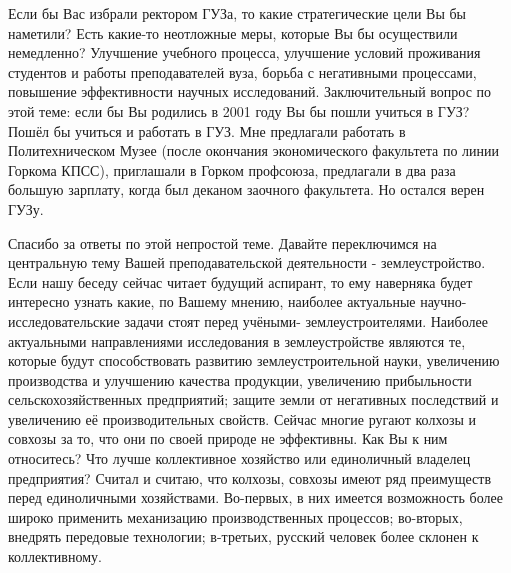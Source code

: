 \begin{drama}
	\maxspeaks Если бы Вас избрали ректором ГУЗа, то какие стратегические цели Вы бы наметили? Есть какие-то неотложные меры, которые Вы бы осуществили немедленно?
	\michaelspeaks Улучшение учебного процесса, улучшение условий проживания студентов и работы преподавателей вуза, борьба с негативными процессами, повышение эффективности научных исследований.
	\maxspeaks Заключительный вопрос по этой теме: если бы Вы родились в 2001 году Вы бы пошли учиться в ГУЗ?
	\michaelspeaks Пошёл бы учиться и работать в ГУЗ. Мне предлагали работать в Политехническом Музее (после окончания экономического факультета по линии Горкома КПСС), приглашали в Горком профсоюза, предлагали в два раза большую зарплату, когда был деканом заочного факультета. Но остался верен ГУЗу.

	\maxspeaks Спасибо за ответы по этой непростой теме. Давайте переключимся на центральную тему Вашей преподавательской деятельности - землеустройство.
Если нашу беседу сейчас читает будущий аспирант, то ему наверняка будет интересно узнать какие, по Вашему мнению, наиболее актуальные научно-исследовательские задачи стоят перед учёными- землеустроителями.
	\michaelspeaks Наиболее актуальными направлениями исследования в землеустройстве являются те, которые будут способствовать развитию землеустроительной науки, увеличению производства и улучшению качества продукции, увеличению прибыльности сельскохозяйственных предприятий; защите земли от негативных последствий и увеличению её производительных свойств.
	\maxspeaks Сейчас многие ругают колхозы и совхозы за то, что они по своей природе не эффективны. Как Вы к ним относитесь? Что лучше коллективное хозяйство или единоличный владелец предприятия?
	\michaelspeaks Считал и считаю, что колхозы, совхозы имеют ряд преимуществ перед единоличными хозяйствами. Во-первых, в них имеется возможность более широко применить механизацию производственных процессов; во-вторых, внедрять передовые технологии; в-третьих, русский человек более склонен к коллективному.



\end{drama}
